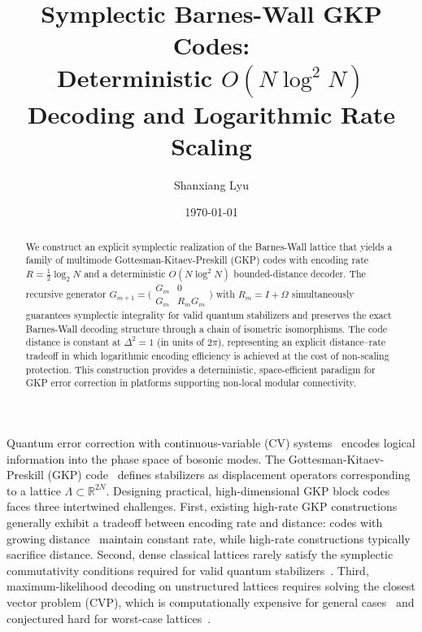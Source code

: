 \documentclass[aps,prl,twocolumn,superscriptaddress]{revtex4-2}
\begin{document}

\title{Symplectic Barnes-Wall GKP Codes:\\Deterministic $O(N \log^2 N)$ Decoding and Logarithmic Rate Scaling}

\author{Shanxiang Lyu}

\date{\today}

\begin{abstract}
We construct an explicit symplectic realization of the Barnes-Wall lattice that yields a family of multimode Gottesman-Kitaev-Preskill (GKP) codes with encoding rate $R = \frac{1}{2}\log_2 N$ and a deterministic $O(N\log^2 N)$ bounded-distance decoder. The recursive generator $G_{m+1} = \bigl(\begin{smallmatrix} G_m & 0 \\ G_m & R_m G_m \end{smallmatrix}\bigr)$ with $R_m = I + \Omega$ simultaneously guarantees symplectic integrality for valid quantum stabilizers and preserves the exact Barnes-Wall decoding structure through a chain of isometric isomorphisms. The code distance is constant at $\Delta^2 = 1$ (in units of $2\pi$), representing an explicit distance--rate tradeoff in which logarithmic encoding efficiency is achieved at the cost of non-scaling protection. This construction provides a deterministic, space-efficient paradigm for GKP error correction in platforms supporting non-local modular connectivity.
\end{abstract}

\maketitle


Quantum error correction with continuous-variable (CV) systems~\cite{gottesman2001,terhal2016,albert2020,campagne2020} encodes logical information into the phase space of bosonic modes. The Gottesman-Kitaev-Preskill (GKP) code~\cite{gottesman2001} defines stabilizers as displacement operators corresponding to a lattice $\Lambda \subset \mathbb{R}^{2N}$. Designing practical, high-dimensional GKP block codes faces three intertwined challenges. First, existing high-rate GKP constructions generally exhibit a tradeoff between encoding rate and distance: codes with growing distance~\cite{conrad2024,bloemer2026} maintain constant rate, while high-rate constructions typically sacrifice distance. Second, dense classical lattices rarely satisfy the symplectic commutativity conditions required for valid quantum stabilizers~\cite{conrad2022}. Third, maximum-likelihood decoding on unstructured lattices requires solving the closest vector problem (CVP), which is computationally expensive for general cases~\cite{agrell2002} and conjectured hard for worst-case lattices~\cite{micciancio2001}.
\end{document}
